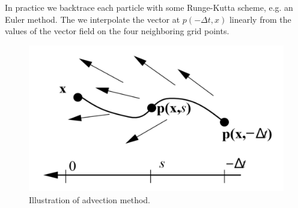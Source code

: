 \documentclass[a4paper,10pt,oneside,final,german,openbib,pdftex,titlepage]{scrbook}
\begin{document}
In practice we backtrace each particle with some Runge-Kutta scheme, e.g. an Euler method. The we interpolate the vector at $p(-\Delta t,x)$ linearly from the values of the vector field on the four neighboring grid points.
\begin{figure}[H]
 \centering
 \includegraphics[scale=0.40]{images/advection.png}
 \caption{Illustration of advection method.}
 \label{Advection}
\end{figure}
\end{document}
